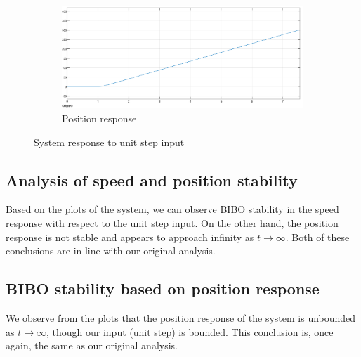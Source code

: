 \documentclass{article}
\begin{document}
\begin{figure}[H]
\begin{subfigure}[b]{0.45\linewidth}
    \end{subfigure}
    \\[\baselineskip]
    \begin{subfigure}[b]{0.45\linewidth}
        \centering
        \includegraphics[width=\linewidth]{position.png}
        \caption{Position response}
        \label{fig:position}
    \end{subfigure}
    \caption{System response to unit step input}
    \label{fig:unitstep}
\end{figure}

\subsection{Analysis of speed and position stability}
Based on the plots of the system, we can observe BIBO stability in the speed response with respect to the unit step input. On the other hand, the position response is not stable and appears to approach infinity as $t\to\infty$. Both of these conclusions are in line with our original analysis.

\subsection{BIBO stability based on position response}
We observe from the plots that the position response of the system is unbounded as $t\to\infty$, though our input (unit step) is bounded. This conclusion is, once again, the same as our original analysis.
\end{document}
